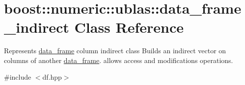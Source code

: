 \hypertarget{classboost_1_1numeric_1_1ublas_1_1data__frame__indirect}{}\section{boost\+:\+:numeric\+:\+:ublas\+:\+:data\+\_\+frame\+\_\+indirect Class Reference}
\label{classboost_1_1numeric_1_1ublas_1_1data__frame__indirect}


Represents \hyperlink{classboost_1_1numeric_1_1ublas_1_1data__frame}{data\+\_\+frame} column indirect class Builds an indirect vector on columns of another \hyperlink{classboost_1_1numeric_1_1ublas_1_1data__frame}{data\+\_\+frame}. allows access and modifications operations.  




{\ttfamily \#include $<$df.\+hpp$>$}

